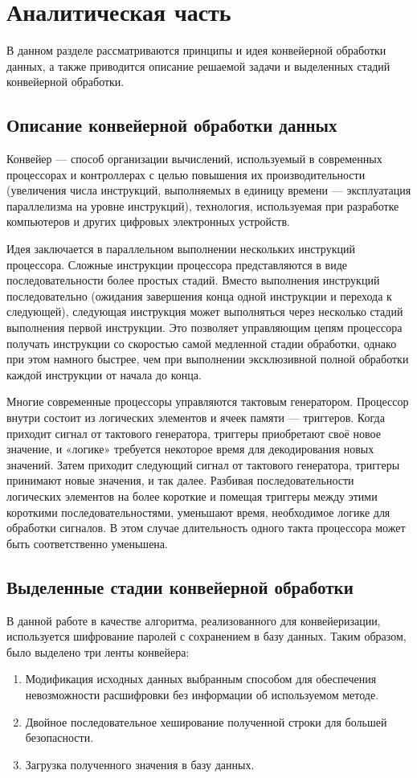 \documentclass[12pt]{report}
\begin{document}
    \chapter{Аналитическая часть}	
    В данном разделе рассматриваются принципы и идея конвейерной обработки данных, а также приводится описание решаемой задачи и выделенных стадий конвейерной обработки.
    
    \section{Описание конвейерной обработки данных}
    Конвейер\cite{conveyor} — способ организации вычислений, используемый в современных процессорах и контроллерах с целью повышения их производительности (увеличения числа инструкций, выполняемых в единицу времени — эксплуатация параллелизма на уровне инструкций), технология, используемая при разработке компьютеров и других цифровых электронных устройств.
    
    Идея заключается в параллельном выполнении нескольких инструкций процессора. Сложные инструкции процессора представляются в виде последовательности более простых стадий. Вместо выполнения инструкций последовательно (ожидания завершения конца одной инструкции и перехода к следующей), следующая инструкция может выполняться через несколько стадий выполнения первой инструкции. Это позволяет управляющим цепям процессора получать инструкции со скоростью самой медленной стадии обработки, однако при этом намного быстрее, чем при выполнении эксклюзивной полной обработки каждой инструкции от начала до конца.
    
    Многие современные процессоры управляются тактовым генератором. Процессор внутри состоит из логических элементов и ячеек памяти — триггеров. Когда приходит сигнал от тактового генератора, триггеры приобретают своё новое значение, и «логике» требуется некоторое время для декодирования новых значений. Затем приходит следующий сигнал от тактового генератора, триггеры принимают новые значения, и так далее. Разбивая последовательности логических элементов на более короткие и помещая триггеры между этими короткими последовательностями, уменьшают время, необходимое логике для обработки сигналов. В этом случае длительность одного такта процессора может быть соответственно уменьшена.
    
    \section{Выделенные стадии конвейерной обработки}
    В данной работе в качестве алгоритма, реализованного для конвейеризации, используется шифрование паролей с сохранением в базу данных. Таким образом, было выделено три ленты конвейера:
    \begin{enumerate}
    	\item Модификация исходных данных выбранным способом для обеспечения невозможности расшифровки без информации об используемом методе.
    	\item Двойное последовательное хеширование полученной строки для большей безопасности.
    	\item Загрузка полученного значения в базу данных.
    \end{enumerate}
\end{document}
